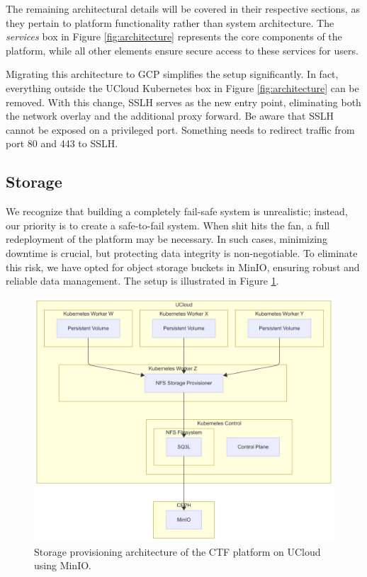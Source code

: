 The remaining architectural details will be covered in their respective sections, as they pertain to platform functionality rather than system architecture. The \textit{services} box in Figure \ref{fig:architecture} represents the core components of the platform, while all other elements ensure secure access to these services for users.

Migrating this architecture to GCP simplifies the setup significantly. In fact, everything outside the UCloud Kubernetes box in Figure \ref{fig:architecture} can be removed. With this change, SSLH serves as the new entry point, eliminating both the network overlay and the additional proxy forward. Be aware that SSLH cannot be exposed on a privileged port. Something needs to redirect traffic from port 80 and 443 to SSLH.

\subsection{Storage}

We recognize that building a completely fail-safe system is unrealistic; instead, our priority is to create a safe-to-fail system. When shit hits the fan, a full redeployment of the platform may be necessary. In such cases, minimizing downtime is crucial, but protecting data integrity is non-negotiable. To eliminate this risk, we have opted for object storage buckets in MinIO, ensuring robust and reliable data management. The setup is illustrated in Figure \ref{fig:storage-provisioning}.

\begin{figure}[h]
    \centering
    \includegraphics[width=1\textwidth]{images/storage-provisioner.png}
    \caption{Storage provisioning architecture of the CTF platform on UCloud using MinIO.}
    \label{fig:storage-provisioning}
\end{figure}

